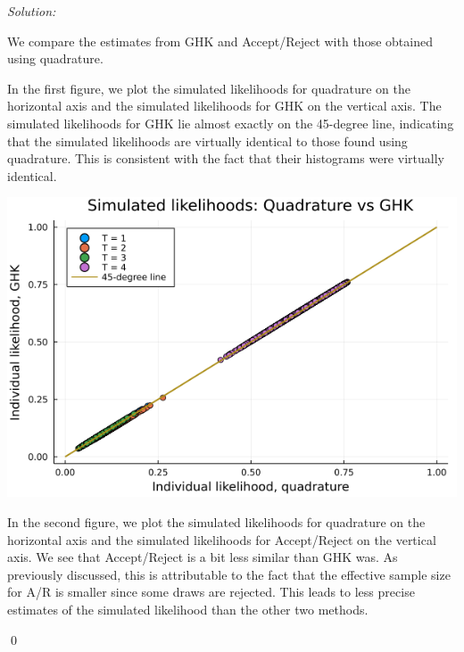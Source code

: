 \documentclass[12pt]{article}
\newenvironment{sol}
    {\emph{Solution:}
    }
    {
    \qed
    }
\begin{document}
\begin{sol}
    We compare the estimates from GHK and Accept/Reject with those obtained using quadrature. 

In the first figure, we plot the simulated likelihoods for quadrature on the horizontal axis and the simulated likelihoods for GHK on the vertical axis. The simulated likelihoods for GHK lie almost exactly on the 45-degree line, indicating that the simulated likelihoods are virtually identical to those found using quadrature. This is consistent with the fact that their histograms were virtually identical.
    \begin{center}
        \includegraphics[scale=0.5]{GHK_comp.png}
    \end{center}
In the second figure, we plot the simulated likelihoods for quadrature on the horizontal axis and the simulated likelihoods for Accept/Reject on the vertical axis. We see that Accept/Reject is a bit less similar than GHK was. As previously discussed, this is attributable to the fact that the effective sample size for A/R is smaller since some draws are rejected. This leads to less precise estimates of the simulated likelihood than the other two methods.


\end{sol}
\end{document}
